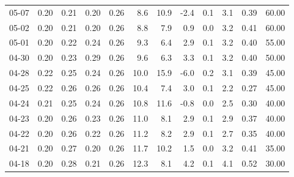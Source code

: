 \begin{threeparttable}
{\begin{tabular}{lrrrrrrrrrrr}
  05-07 &          0.20 &          0.21 &          0.20 &        0.26 &                 8.6 &                10.9 &       -2.4 &                 0.1 &              3.1 &            0.39 &                  60.00 \\
  05-02 &          0.20 &          0.21 &          0.20 &        0.26 &                 8.8 &                 7.9 &        0.9 &                 0.0 &              3.2 &            0.41 &                  60.00 \\
  05-01 &          0.20 &          0.22 &          0.24 &        0.26 &                 9.3 &                 6.4 &        2.9 &                 0.1 &              3.2 &            0.40 &                  55.00 \\
  04-30 &          0.20 &          0.23 &          0.29 &        0.26 &                 9.6 &                 6.3 &        3.3 &                 0.1 &              3.2 &            0.40 &                  50.00 \\
  04-28 &          0.22 &          0.25 &          0.24 &        0.26 &                10.0 &                15.9 &       -6.0 &                 0.2 &              3.1 &            0.39 &                  45.00 \\
  04-25 &          0.22 &          0.26 &          0.26 &        0.26 &                10.4 &                 7.4 &        3.0 &                 0.1 &              2.2 &            0.27 &                  45.00 \\
  04-24 &          0.21 &          0.25 &          0.24 &        0.26 &                10.8 &                11.6 &       -0.8 &                 0.0 &              2.5 &            0.30 &                  40.00 \\
  04-23 &          0.20 &          0.26 &          0.23 &        0.26 &                11.0 &                 8.1 &        2.9 &                 0.1 &              2.9 &            0.37 &                  40.00 \\
  04-22 &          0.20 &          0.26 &          0.22 &        0.26 &                11.2 &                 8.2 &        2.9 &                 0.1 &              2.7 &            0.35 &                  40.00 \\
  04-21 &          0.20 &          0.27 &          0.20 &        0.26 &                11.7 &                10.2 &        1.5 &                 0.0 &              3.2 &            0.41 &                  35.00 \\
  04-18 &          0.20 &          0.28 &          0.21 &        0.26 &                12.3 &                 8.1 &        4.2 &                 0.1 &              4.1 &            0.52 &                  30.00 \\

\end{tabular}}
\end{threeparttable}
